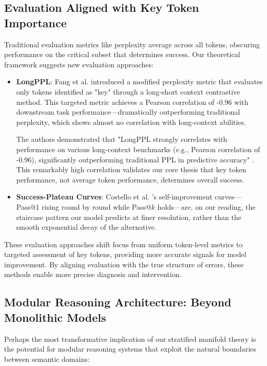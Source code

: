 \documentclass{article}
\begin{document}
\subsection{Evaluation Aligned with Key Token Importance}

Traditional evaluation metrics like perplexity average across all tokens, obscuring performance on the critical subset that determines success. Our theoretical framework suggests new evaluation approaches:

\begin{itemize}
\item \textbf{LongPPL}: Fang et al. \citep{fang2024what} introduced a modified perplexity metric that evaluates only tokens identified as "key" through a long-short context contrastive method. This targeted metric achieves a Pearson correlation of -0.96 with downstream task performance—dramatically outperforming traditional perplexity, which shows almost no correlation with long-context abilities.

  The authors demonstrated that "LongPPL strongly correlates with performance on various long-context benchmarks (e.g., Pearson correlation of -0.96), significantly outperforming traditional PPL in predictive accuracy" \citep{fang2024what}. This remarkably high correlation validates our core thesis that key token performance, not average token performance, determines overall success.

\item \textbf{Success-Plateau Curves}: Costello et al. \citep{costello2025think}'s self-improvement curves---Pass@1 rising round by round while Pass@$k$ holds---are, on our reading, the staircase pattern our model predicts at finer resolution, rather than the smooth exponential decay of the alternative.
\end{itemize}

These evaluation approaches shift focus from uniform token-level metrics to targeted assessment of key tokens, providing more accurate signals for model improvement. By aligning evaluation with the true structure of errors, these methods enable more precise diagnosis and intervention.

\subsection{Modular Reasoning Architecture: Beyond Monolithic Models}

Perhaps the most transformative implication of our stratified manifold theory is the potential for modular reasoning systems that exploit the natural boundaries between semantic domains:
\end{document}
